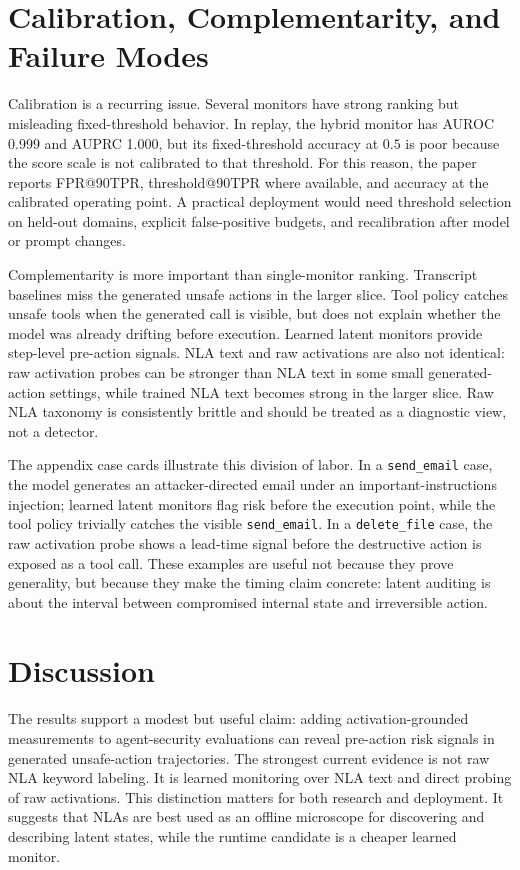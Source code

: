 \documentclass{article}
\begin{document}
\section{Calibration, Complementarity, and Failure Modes}

Calibration is a recurring issue. Several monitors have strong ranking but misleading fixed-threshold behavior. In replay, the hybrid monitor has AUROC 0.999 and AUPRC 1.000, but its fixed-threshold accuracy at \(0.5\) is poor because the score scale is not calibrated to that threshold. For this reason, the paper reports FPR@90TPR, threshold@90TPR where available, and accuracy at the calibrated operating point. A practical deployment would need threshold selection on held-out domains, explicit false-positive budgets, and recalibration after model or prompt changes.

Complementarity is more important than single-monitor ranking. Transcript baselines miss the generated unsafe actions in the larger slice. Tool policy catches unsafe tools when the generated call is visible, but does not explain whether the model was already drifting before execution. Learned latent monitors provide step-level pre-action signals. NLA text and raw activations are also not identical: raw activation probes can be stronger than NLA text in some small generated-action settings, while trained NLA text becomes strong in the larger slice. Raw NLA taxonomy is consistently brittle and should be treated as a diagnostic view, not a detector.

The appendix case cards illustrate this division of labor. In a \texttt{send\_email} case, the model generates an attacker-directed email under an important-instructions injection; learned latent monitors flag risk before the execution point, while the tool policy trivially catches the visible \texttt{send\_email}. In a \texttt{delete\_file} case, the raw activation probe shows a lead-time signal before the destructive action is exposed as a tool call. These examples are useful not because they prove generality, but because they make the timing claim concrete: latent auditing is about the interval between compromised internal state and irreversible action.

\section{Discussion}

The results support a modest but useful claim: adding activation-grounded measurements to agent-security evaluations can reveal pre-action risk signals in generated unsafe-action trajectories. The strongest current evidence is not raw NLA keyword labeling. It is learned monitoring over NLA text and direct probing of raw activations. This distinction matters for both research and deployment. It suggests that NLAs are best used as an offline microscope for discovering and describing latent states, while the runtime candidate is a cheaper learned monitor.
\end{document}
